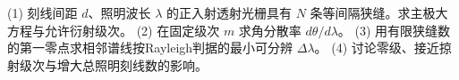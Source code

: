 (1) 刻线间距 \(d\)、照明波长 \(\lambda\) 的正入射透射光栅具有 \(N\) 条等间隔狭缝。求主极大方程与允许衍射级次。
(2) 在固定级次 \(m\) 求角分散率 \(d\theta/d\lambda\)。
(3) 用有限狭缝数的第一零点求相邻谱线按Rayleigh判据的最小可分辨 \(\Delta\lambda\)。
(4) 讨论零级、接近掠射级次与增大总照明刻线数的影响。

